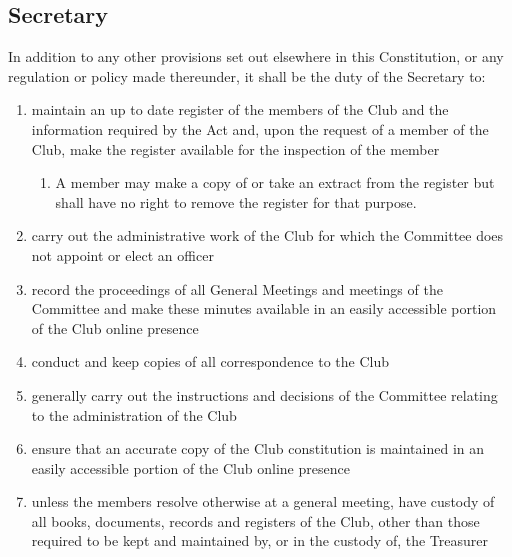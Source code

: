 \documentclass[11pt]{article} %
\begin{document}
\subsection{Secretary}
In addition to any other provisions set out elsewhere in this Constitution, or any regulation or policy made thereunder, it shall be the duty of the Secretary to:
\begin{enumerate}
	\item maintain an up to date register of the members of the Club and the information required by the Act and, upon the request of a member of the Club, make the register available for the inspection of the member
	\begin{enumerate}[1.]
			\item A member may make a copy of or take an extract from the register but shall have no right to remove the register for that purpose.
		\end{enumerate}
	\item carry out the administrative work of the Club for which the Committee does not appoint or elect an officer
	\item record the proceedings of all General Meetings and meetings of the Committee and make these minutes available in an easily accessible portion of the Club online presence
	\item conduct and keep copies of all correspondence to the Club
	\item generally carry out the instructions and decisions of the Committee relating to the administration of the Club
	\item ensure that an accurate copy of the Club constitution is maintained in an easily accessible portion of the Club online presence
	\item unless the members resolve otherwise at a general meeting, have custody of all books, documents, records and registers of the Club, other than those required to be kept and maintained by, or in the custody of, the Treasurer
\end{enumerate}
\end{document}
